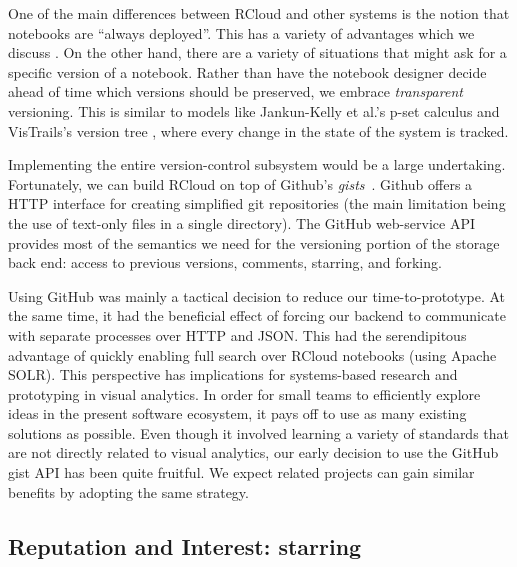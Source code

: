 One of the main differences between RCloud and other systems is the
notion that notebooks are ``always deployed''. This has a variety of
advantages which we discuss . On the other hand, there
are a variety of situations that might ask for a specific version of a
notebook. Rather than have the notebook designer decide ahead of time
which versions should be preserved, we embrace \emph{transparent} versioning.
This is similar to models like Jankun-Kelly et al.'s p-set calculus 
and VisTrails's version tree , where every change in the state of the
system is tracked.

Implementing the entire version-control subsystem would be a large
undertaking. Fortunately, we can build RCloud on top of Github's
\emph{gists}~. Github offers a HTTP interface
for creating simplified git repositories (the main limitation being the
use of text-only files in a single directory). The GitHub web-service
API provides most of the semantics we need for the versioning
portion of the storage back end: access to previous versions,
comments, starring, and forking.

Using GitHub was mainly a tactical decision to reduce our
time-to-prototype. At the same time, it had the beneficial effect of
forcing our backend to communicate with separate processes over HTTP
and JSON. This had the serendipitous advantage of quickly enabling
full search over RCloud notebooks (using Apache SOLR).
%
This perspective has implications for
systems-based research and prototyping in visual analytics.
%
In order for small teams to efficiently explore ideas in the present
software ecosystem, it pays off to use as many existing solutions as
possible.
%
Even though it involved learning a variety of standards that are not
directly related to visual analytics, our early decision to use the
GitHub gist API has been quite fruitful. We expect related projects
can gain similar benefits by adopting the same strategy.


\subsection{Reputation and Interest: starring\label{sec:starring}}

